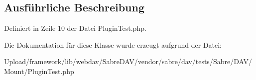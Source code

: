 \subsection{Ausführliche Beschreibung}


Definiert in Zeile 10 der Datei Plugin\+Test.\+php.



Die Dokumentation für diese Klasse wurde erzeugt aufgrund der Datei\+:\begin{DoxyCompactItemize}
\item 
Upload/framework/lib/webdav/\+Sabre\+D\+A\+V/vendor/sabre/dav/tests/\+Sabre/\+D\+A\+V/\+Mount/Plugin\+Test.\+php\end{DoxyCompactItemize}
